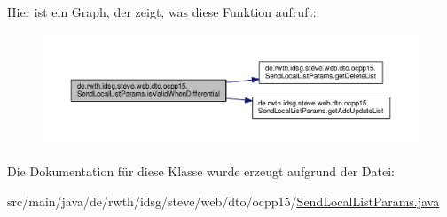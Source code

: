 Hier ist ein Graph, der zeigt, was diese Funktion aufruft\-:\nopagebreak
\begin{figure}[H]
\begin{center}
\leavevmode
\includegraphics[width=350pt]{classde_1_1rwth_1_1idsg_1_1steve_1_1web_1_1dto_1_1ocpp15_1_1_send_local_list_params_af7879e85d278508abf6aa14a3ee34d06_cgraph}
\end{center}
\end{figure}




Die Dokumentation für diese Klasse wurde erzeugt aufgrund der Datei\-:\begin{DoxyCompactItemize}
\item 
src/main/java/de/rwth/idsg/steve/web/dto/ocpp15/\hyperlink{_send_local_list_params_8java}{Send\-Local\-List\-Params.\-java}\end{DoxyCompactItemize}
